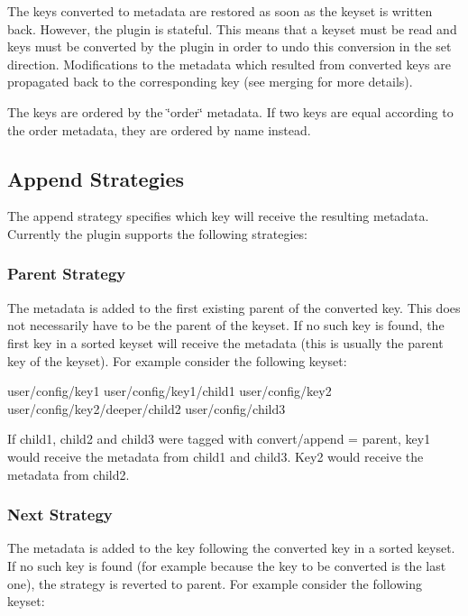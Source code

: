The keys converted to metadata are restored as soon as the keyset is written back. However, the plugin is stateful. This means that a keyset must be read and keys must be converted by the plugin in order to undo this conversion in the set direction. Modifications to the metadata which resulted from converted keys are propagated back to the corresponding key (see merging for more details).

The keys are ordered by the \char`\"{}order\char`\"{} metadata. If two keys are equal according to the order metadata, they are ordered by name instead.

\subsection*{Append Strategies}

The append strategy specifies which key will receive the resulting metadata. Currently the plugin supports the following strategies\+:

\subsubsection*{Parent Strategy}

The metadata is added to the first existing parent of the converted key. This does not necessarily have to be the parent of the keyset. If no such key is found, the first key in a sorted keyset will receive the metadata (this is usually the parent key of the keyset). For example consider the following keyset\+:


\begin{DoxyCode}
user/config/key1
user/config/key1/child1
user/config/key2
user/config/key2/deeper/child2
user/config/child3
\end{DoxyCode}


If child1, child2 and child3 were tagged with {\ttfamily convert/append = parent}, key1 would receive the metadata from child1 and child3. Key2 would receive the metadata from child2.

\subsubsection*{Next Strategy}

The metadata is added to the key following the converted key in a sorted keyset. If no such key is found (for example because the key to be converted is the last one), the strategy is reverted to parent. For example consider the following keyset\+:


